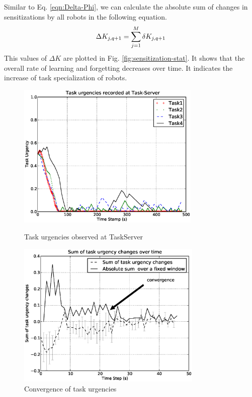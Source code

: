 \documentclass{llncs}
\begin{document}
%
Similar to Eq. \ref{eqn:Delta-Phi}, we can calculate the absolute sum of changes in sensitizations by all robots in the following equation.
% 
\begin{equation}
\small 
\Delta K_{j, q+1} = \sum_{j=1}^{M} \delta K_{j, q+1} 
\label{eqn:Delta-K}
\end{equation}
This values of $\Delta K$ are plotted in Fig. \ref{fig:sensitization-stat}. It shows that the overall rate of learning and forgetting decreases over time. It indicates the increase of task specialization of robots.
%
\begin{figure}
\centering
\includegraphics[height=7cm, angle=0]
{images/global/GlobalPlotUrgencyLog-2010Feb18-151600-clear.eps}
\caption{\small Task urgencies observed at TaskServer}
\label{fig:raw-urgencies} %
\centering
\includegraphics[height=7cm, angle=0]{images/global/TaskUrgencyConvergence-step2-th-p1.eps}
\caption{\small Convergence of task urgencies}
\label{fig:urgency-convergence} %
\end{figure}
\end{document}
